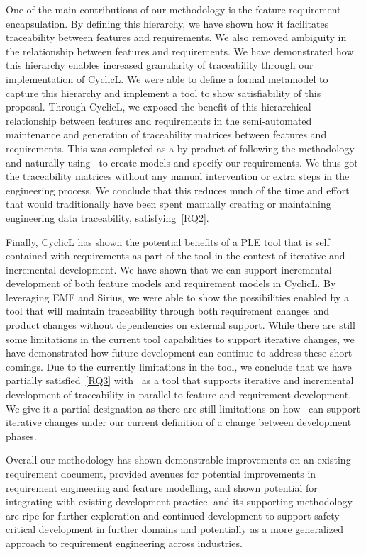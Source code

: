 One of the main contributions of our methodology is the feature-requirement encapsulation. By defining this hierarchy, we have shown how it facilitates traceability between features and requirements. We also removed ambiguity in the relationship between features and requirements. We have demonstrated how this hierarchy enables increased granularity of traceability through our implementation of CyclicL. We were able to define a formal metamodel to capture this hierarchy and implement a tool to show satisfiability of this proposal. Through CyclicL, we exposed the benefit of this hierarchical relationship between features and requirements in the semi-automated maintenance and generation of traceability matrices between features and requirements. This was completed as a by product of following the methodology and naturally using \tool\ to create models and specify our requirements. We thus got the traceability matrices without any manual intervention or extra steps in the engineering process. We conclude that this reduces much of the time and effort that would traditionally have been spent manually creating or maintaining engineering data traceability, satisfying~\ref{RQ2}.


Finally, CyclicL has shown the potential benefits of a \ac{PLE} tool that is self contained with requirements as part of the tool in the context of iterative and incremental development. We have shown that we can support incremental development of both feature models and requirement models in CyclicL. By leveraging \ac{EMF} and Sirius, we were able to show the possibilities enabled by a tool that will maintain traceability through both requirement changes and product changes without dependencies on external support. While there are still some limitations in the current tool capabilities to support iterative changes, we have demonstrated how future development can continue to address these short-comings. Due to the currently limitations in the tool, we conclude that we have partially satisfied~\ref{RQ3} with \tool\ as a tool that supports iterative and incremental development of traceability in parallel to feature and requirement development. We give it a partial designation as there are still limitations on how \tool\ can support iterative changes under our current definition of a change between development phases.

Overall our methodology has shown demonstrable improvements on an existing requirement document, provided avenues for potential improvements in requirement engineering and feature modelling, and shown potential for integrating with existing development practice. \tool and its supporting methodology are ripe for further exploration and continued development to support safety-critical development in further domains and potentially as a more generalized approach to requirement engineering across industries.


